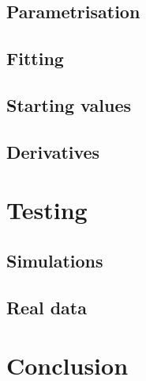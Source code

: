 \subsection{Parametrisation}

\subsection{Fitting}

\subsection{Starting values}

\subsection{Derivatives}



\section{Testing}

\subsection{Simulations}

\subsection{Real data}


\section{Conclusion}